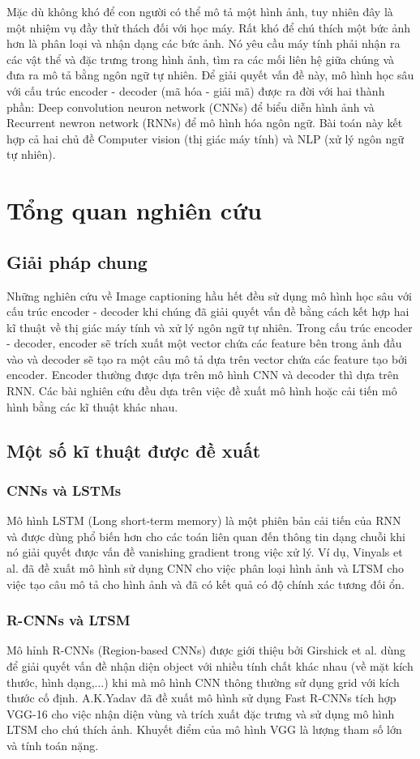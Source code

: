 \documentclass[conference]{IEEEtran}
\begin{document}
Mặc dù không khó để con người có thể mô tả một hình ảnh, tuy nhiên đây là một nhiệm vụ đầy thử thách đối với học máy.
Rất khó để chú thích một bức ảnh hơn là phân loại và nhận dạng các bức ảnh.
Nó yêu cầu máy tính phải nhận ra các vật thể và đặc trưng trong hình ảnh, tìm ra các mối liên hệ giữa chúng và đưa ra mô tả bằng ngôn ngữ tự nhiên.
Để giải quyết vấn đề này, mô hình học sâu với cấu trúc encoder - decoder (mã hóa - giải mã) được ra đời với hai thành phần: Deep convolution neuron network (CNNs) để biểu diễn hình ảnh và Recurrent newron network (RNNs) để mô hình hóa ngôn ngữ.
Bài toán này kết hợp cả hai chủ đề Computer vision (thị giác máy tính) và NLP (xử lý ngôn ngữ tự nhiên).

\section{Tổng quan nghiên cứu}
\subsection{Giải pháp chung}
Những nghiên cứu về Image captioning hầu hết đều sử dụng mô hình học sâu với cấu trúc encoder - decoder khi chúng đã giải quyết vấn đề bằng cách kết hợp hai kĩ thuật về thị giác máy tính và xử lý ngôn ngữ tự nhiên.
Trong cấu trúc encoder - decoder, encoder sẽ trích xuất một vector chứa các feature bên trong ảnh đầu vào và decoder sẽ tạo ra một câu mô tả dựa trên vector chứa các feature tạo bởi encoder.
Encoder thường được dựa trên mô hình CNN và decoder thì dựa trên RNN. Các bài nghiên cứu đều dựa trên việc đề xuất mô hình hoặc cải tiến mô hình bằng các kĩ thuật khác nhau. 

\subsection{Một số kĩ thuật được đề xuất}
\subsubsection{CNNs và LSTMs} 
Mô hình LSTM (Long short-term memory) \cite{b2} là một phiên bản cải tiến của RNN và được dùng phổ biến hơn cho các toán liên quan đến thông tin dạng chuỗi khi nó giải quyết được vấn đề vanishing gradient trong việc xử lý. Ví dụ, Vinyals et al. đã đề xuất mô hình sử dụng CNN cho việc phân loại hình ảnh và LTSM cho việc tạo câu mô tả cho hình ảnh \cite{b1} và đã có kết quả có độ chính xác tương đối ổn.
\subsubsection{R-CNNs và LTSM}
Mô hỉnh R-CNNs (Region-based CNNs) được giới thiệu bởi Girshick et al. \cite{b3} dùng để giải quyết vấn đề nhận diện object với nhiều tính chất khác nhau (về mặt kích thước, hình dạng,...) khi mà mô hình CNN thông thường sử dụng grid với kích thước cố định. A.K.Yadav đã đề xuất mô hình sử dụng Fast R-CNNs tích hợp VGG-16 cho việc nhận diện vùng và trích xuất đặc trưng và sử dụng mô hình LTSM cho chú thích ảnh. Khuyết điểm của mô hình VGG là lượng tham số lớn và tính toán nặng.  
\end{document}

